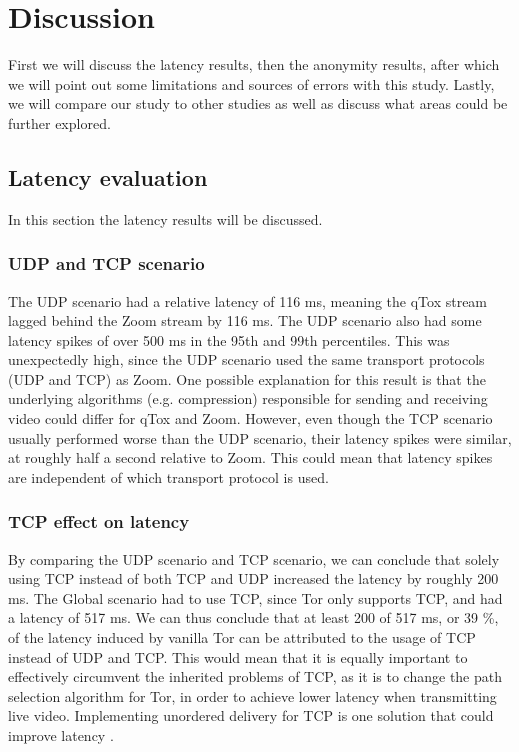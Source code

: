 \documentclass{kththesis}
\begin{document}
\chapter{Discussion}
First we will discuss the latency results, then the anonymity results, after which we will point out some limitations and sources of errors with this study. Lastly, we will compare our study to other studies as well as discuss what areas could be further explored. 

\section{Latency evaluation}
In this section the latency results will be discussed.

\subsection{UDP and TCP scenario}
The UDP scenario had a relative latency of 116 ms, meaning the qTox stream lagged behind the Zoom stream by 116 ms. The UDP scenario also had some latency spikes of over 500 ms in the 95th and 99th percentiles. This was unexpectedly high, since the UDP scenario used the same transport protocols (UDP and TCP) as Zoom. One possible explanation for this result is that the underlying algorithms (e.g. compression) responsible for sending and receiving video could differ for qTox and Zoom. However, even though the TCP scenario usually performed worse than the UDP scenario, their latency spikes were similar, at roughly half a second relative to Zoom. This could mean that latency spikes are independent of which transport protocol is used.

\subsection{TCP effect on latency}
By comparing the UDP scenario and TCP scenario, we can conclude that solely using TCP instead of both TCP and UDP increased the latency by roughly 200 ms. The Global scenario had to use TCP, since Tor only supports TCP, and had a latency of 517 ms. We can thus conclude that at least 200 of 517 ms, or 39 \%, of the latency induced by vanilla Tor can be attributed to the usage of TCP instead of UDP and TCP. This would mean that it is equally important to effectively circumvent the inherited problems of TCP, as it is to change the path selection algorithm for Tor, in order to achieve lower latency when transmitting live video. Implementing unordered delivery for TCP is one solution that could improve latency \parencite{unorderedTCPdelivery}. 
\end{document}
